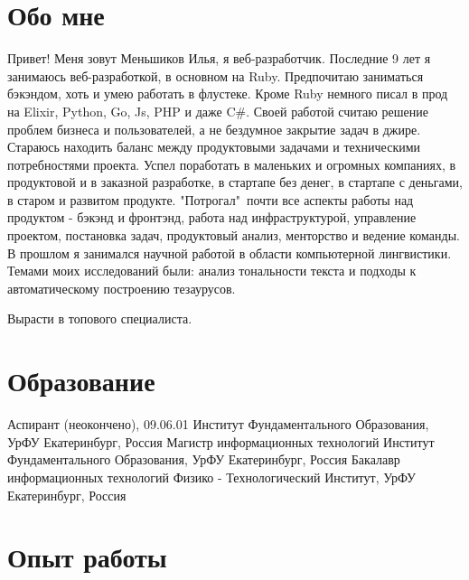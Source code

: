 \documentclass[11pt,a4paper]{moderncv}
\begin{document}
\maketitle

\section{Обо мне}
 {
  Привет! Меня зовут Меньшиков Илья, я веб-разработчик.
}
\cvitem{} {
  Последние 9 лет я занимаюсь веб-разработкой, в основном на Ruby. Предпочитаю заниматься бэкэндом, хоть и умею работать в флустеке. Кроме Ruby немного писал в прод на Elixir, Python, Go, Js, PHP и даже C\#.
}
\cvitem{} {
  Своей работой считаю решение проблем бизнеса и пользователей, а не бездумное закрытие задач в джире. Стараюсь находить баланс между продуктовыми задачами и техническими потребностями проекта.
}
\cvitem{} {
  Успел поработать в маленьких и огромных компаниях, в продуктовой и в заказной разработке, в стартапе без денег, в стартапе с деньгами, в старом и развитом продукте. "Потрогал"\ почти все аспекты работы над продуктом - бэкэнд и фронтэнд, работа над инфраструктурой, управление проектом,  постановка задач, продуктовый анализ, менторство и ведение команды.
}
\cvitem{} {
  В прошлом я занимался научной работой в области компьютерной лингвистики. Темами моих исследований были: анализ тональности текста и подходы к автоматическому построению тезаурусов.
}

 {
  Вырасти в топового специалиста.
}


\section{Образование}

  {Аспирант (неокончено), 09.06.01}
  {Институт Фундаментального Образования, УрФУ}
  {Екатеринбург, Россия}
{}{}
  {Магистр информационных технологий}
  {Институт Фундаментального Образования, УрФУ}
  {Екатеринбург, Россия}
{}{}
  {Бакалавр информационных технологий}
  {Физико - Технологический Институт, УрФУ}
  {Екатеринбург, Россия}
{}{}

\section{Опыт работы}
\end{document}
